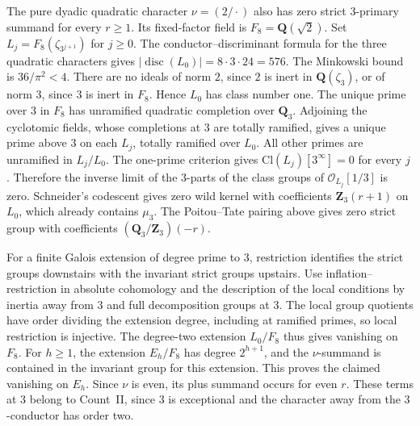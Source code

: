 %
The pure dyadic quadratic character \(\nu=(2/\cdot)\) also has zero
strict \(3\)-primary summand for every \(r\ge1\). Its fixed-factor
field is \(F_8=\mathbf Q(\sqrt2)\). Set
\(L_j=F_8(\zeta_{3^{j+1}})\) for \(j\ge0\).
The conductor--discriminant formula for the three quadratic
characters gives \(|\operatorname{disc}(L_0)|=8\cdot3\cdot24=576\).
The Minkowski bound is \(36/\pi^2<4\). There are no ideals of norm
\(2\), since \(2\) is inert in \(\mathbf Q(\zeta_3)\), or of norm
\(3\), since \(3\) is inert in \(F_8\). Hence \(L_0\) has class
number one. The unique prime over \(3\) in \(F_8\) has unramified
quadratic completion over \(\mathbf Q_3\). Adjoining the cyclotomic
fields, whose completions at \(3\) are totally ramified, gives a
unique prime above \(3\) on each \(L_j\), totally ramified over
\(L_0\). All other primes are unramified in \(L_j/L_0\). The
one-prime criterion gives \(\mathrm{Cl}(L_j)[3^\infty]=0\) for every
\(j\) \cite{f2-iwasawa-class}. Therefore the inverse limit of the
\(3\)-parts of the class groups of \(\mathcal O_{L_j}[1/3]\) is
zero. Schneider's codescent gives zero wild kernel with coefficients
\(\mathbf Z_3(r+1)\) on \(L_0\), which already contains \(\mu_3\).
The Poitou--Tate pairing above gives zero strict group with
coefficients \((\mathbf Q_3/\mathbf Z_3)(-r)\).
\cite[Theorem~3.1]{f2-validire}

For a finite Galois extension of degree prime to \(3\), restriction
identifies the strict groups downstairs with the invariant strict
groups upstairs. Use inflation--restriction in absolute cohomology
and the description of the local conditions by inertia away from
\(3\) and full decomposition groups at \(3\). The local group
quotients have order dividing the extension degree, including at
ramified primes, so local restriction is injective. The degree-two
extension \(L_0/F_8\) thus gives vanishing on \(F_8\). For \(h\ge1\),
the extension \(E_h/F_8\) has degree \(2^{h+1}\), and the
\(\nu\)-summand is contained in the invariant group for this extension.
This proves the claimed vanishing on \(E_h\). Since \(\nu\) is even,
its plus summand occurs for even \(r\). These terms at \(3\) belong
to Count~II, since \(3\) is exceptional and the character away from
the \(3\)-conductor has order two.

